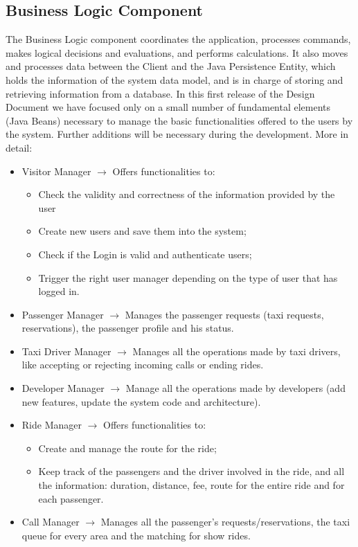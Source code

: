 \subsection{Business Logic Component}
The Business Logic component coordinates the application, processes commands, makes logical decisions and evaluations, and performs calculations. It also moves and processes data between the Client and the Java Persistence Entity, which holds the information of the system data model, and is in charge of storing and retrieving information from a database.
In this first release of the Design Document we have focused only on a small number of fundamental elements (Java Beans) necessary to manage the basic functionalities offered to the users by the system. Further additions will be necessary during the development.
More in detail:
\begin{itemize}
	\item Visitor Manager $\rightarrow$ Offers functionalities to:
	\begin{itemize}
		\item Check the validity and correctness of the information provided by the user 
		\item Create new users and save them into the system;
		\item Check if the Login is valid and authenticate users;
		\item Trigger the right user manager depending on the type of user that has logged in.
	\end{itemize}
	\item Passenger Manager $\rightarrow$ Manages the passenger requests (taxi requests, reservations), the passenger profile and his status.
	\item Taxi Driver Manager $\rightarrow$ Manages all the operations made by taxi drivers, like accepting or rejecting incoming calls or ending rides.
	\item Developer Manager $\rightarrow$ Manage all the operations made by developers (add new features, update the system code and architecture).
	\item Ride Manager $\rightarrow$ Offers functionalities to:
	\begin{itemize}
		\item Create and manage the route for the ride;
		\item Keep track of the passengers and the driver involved in the ride, and all the information: duration, distance, fee, route for the entire ride and for each passenger.
	\end{itemize}
	\item Call Manager $\rightarrow$ Manages all the passenger's requests/reservations, the taxi queue for every area and the matching for show rides.
\end{itemize}


